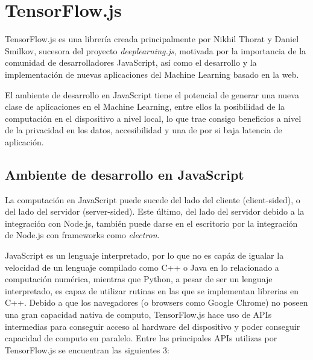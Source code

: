 \section{TensorFlow.js}

TensorFlow.js es una librería creada principalmente por Nikhil Thorat y Daniel Smilkov, sucesora
del proyecto \emph{deeplearning.js}, motivada por la importancia de la comunidad de
desarrolladores JavaScript, así como el desarrollo y la implementación de nuevas aplicaciones del Machine Learning basado en la web.


El ambiente de desarrollo en JavaScript tiene el potencial de generar una nueva clase de aplicaciones en el Machine Learning, entre
ellos la posibilidad de la computación en el dispositivo a nivel local, lo que trae consigo beneficios a nivel de la
privacidad en los datos, accesibilidad y una de por si baja latencia de aplicación.





\subsection{Ambiente de desarrollo en JavaScript}

La computación en JavaScript puede sucede del lado del cliente (client-sided), o del lado del servidor (server-sided).
Este último, del lado del servidor debido a la integración con Node.js, también puede darse en el escritorio por la integración de Node.js con frameworks como \emph{electron}.

JavaScript es un lenguaje interpretado, por lo que no es capáz de igualar la velocidad de un lenguaje compilado
como C++ o Java en lo relacionado a computación numérica, mientras que Python, a pesar de ser un
lenguaje interpretado, es capaz de utilizar rutinas en las que se
implementan librerias en C++. Debido a que los navegadores (o browsers como Google Chrome) no poseen una gran capacidad
nativa de computo, TensorFlow.js hace uso de APIs intermedias para conseguir acceso al hardware del dispositivo
y poder conseguir capacidad de computo en paralelo.
Entre las principales APIs utilizas por TensorFlow.js se encuentran las siguientes 3:

